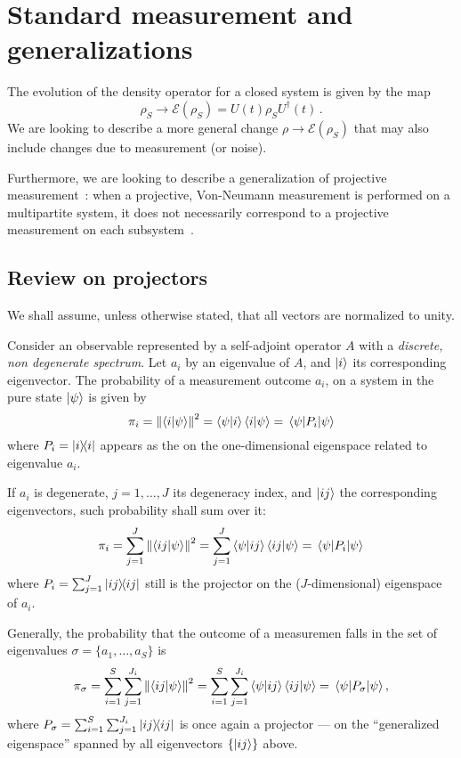 \section{Standard measurement and generalizations}

The evolution of the density operator for a closed system is given by the map
\[
    \rho_{S} \rightarrow \mathcal{E}(\rho_{S}) = U(t)\rho_{S}U^{\dagger}(t) \, \text{.}
\] 
We are looking to describe a more general change
$\rho \rightarrow \mathcal{E}(\rho_{S})$ that may also include
changes due to measurement (or noise).

Furthermore, we are looking to describe a generalization
of projective measurement~\parencite{VonNeumann}:
when a projective, Von-Neumann
measurement is performed on a multipartite system,
it does not necessarily correspond to a projective measurement
on each subsystem~\parencite[Ch. 3]{PreskillNotes}.

\subsection{Review on projectors}

We shall assume, unless otherwise stated, that all vectors are
normalized to unity.

Consider an observable represented by a self-adjoint operator $A$
with a 
\emph{discrete, non degenerate spectrum}.
Let $a_i$ by an eigenvalue of $A$, and $\ket{i}$ its corresponding eigenvector.
The probability of a measurement
outcome $a_i$,
on a system in the pure state $\ket{\psi}$
is given by
$$
\pi_{i} = \norm{\braket{i}{\psi}}^2
        = \bra{\psi}\ket{i}\bra{i}\ket{\psi}
        = \mel{\psi}{P_{i}}{\psi}
$$
where $P_{i} = \ketbra{i}$ appears as the  on the
one-dimensional ei\-gen\-space related to eigenvalue  $a_i$.

If $a_i$ is degenerate, $j = 1, \dots, J$ its degeneracy index, and $\ket{ij}$ the corresponding eigenvectors,
such probability shall sum over it:
$$
\pi_{i} = \sum_{j=1}^{J}\norm{\braket{ij}{\psi}}^2
        = \sum_{j=1}^{J}\bra{\psi}\ket{ij}\bra{ij}\ket{\psi}
        = \mel{\psi}{P_{i}}{\psi}
$$
where $P_{i} = \sum_{j=1}^{J}\ketbra{ij}$
still is the projector on the
($J$-dimensional) eigenspace of $a_i$.

Generally, the probability that the outcome of a measuremen falls in
the set of eigenvalues $\sigma = \{a_{1}, \dots, a_{S}\}$ is
\begin{equation}\label{eq:pi_sigma}
\pi_{\sigma}  = \sum_{i=1}^{S}\sum_{j=1}^{J_{i}}\norm{\braket{ij}{\psi}}^2
              = \sum_{i=1}^{S}\sum_{j=1}^{J_{i}}\bra{\psi}\ket{ij}\bra{ij}\ket{\psi}
              = \mel{\psi}{P_{\sigma}}{\psi}
              ,
\end{equation}
where $P_{\sigma} = \sum_{i=1}^{S}\sum_{j=1}^{J_{i}}\ketbra{ij}$
is once again a projector --- on the ``generalized eigenspace'' spanned by all
eigenvectors $\{\ket{ij}\}$ above.

